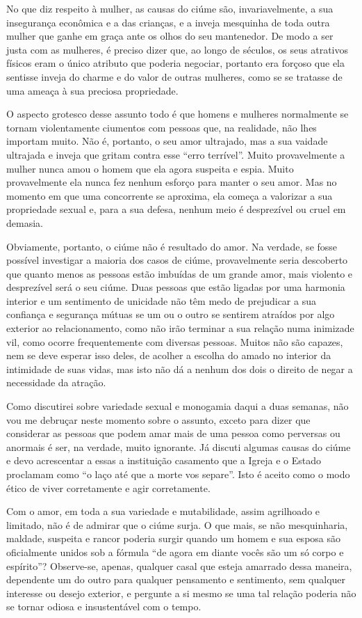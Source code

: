 No que diz respeito à mulher, as causas do ciúme são, invariavelmente, a
sua insegurança econômica e a das crianças, e a inveja mesquinha de toda
outra mulher que ganhe em graça ante os olhos do seu mantenedor. De modo a
ser justa com as mulheres, é preciso dizer que, ao longo de séculos, os seus
atrativos físicos eram o único atributo que poderia negociar, portanto era
forçoso que ela sentisse inveja do charme e do valor de outras mulheres,
como se se tratasse de uma ameaça à sua preciosa propriedade.

O aspecto grotesco desse assunto todo é que homens e mulheres
normalmente se tornam violentamente ciumentos com pessoas que, na
realidade, não lhes importam muito. Não é, portanto, o seu amor\label{ciume}
ultrajado, mas a sua vaidade ultrajada e inveja que gritam contra esse
``erro terrível''. Muito provavelmente a mulher nunca amou o homem que
ela agora suspeita e espia. Muito provavelmente ela nunca fez nenhum
esforço para manter o seu amor. Mas no momento em que uma concorrente se
aproxima, ela começa a valorizar a sua propriedade sexual e, para a sua
defesa, nenhum meio é desprezível ou cruel em demasia.

Obviamente, portanto, o ciúme não é resultado do amor. Na verdade, se
fosse possível investigar a maioria dos casos de ciúme, provavelmente
seria descoberto que quanto menos as pessoas estão imbuídas de um grande
amor, mais violento e desprezível será o seu ciúme. Duas pessoas que
estão ligadas por uma harmonia interior e um sentimento de unicidade não
têm medo de prejudicar a sua confiança e segurança mútuas se um ou o
outro se sentirem atraídos por algo exterior ao relacionamento, como não
irão terminar a sua relação numa inimizade vil, como ocorre
frequentemente com diversas pessoas. Muitos não são capazes, nem se deve
esperar isso deles, de acolher a escolha do amado no interior da
intimidade de suas vidas, mas isto não dá a nenhum dos dois o direito de
negar a necessidade da atração.

Como discutirei sobre variedade sexual e monogamia daqui a duas semanas,
não vou me debruçar neste momento sobre o assunto, exceto para dizer que
considerar as pessoas que podem amar mais de uma pessoa como perversas
ou anormais é ser, na verdade, muito ignorante. Já discuti algumas
causas do ciúme e devo acrescentar a essas a instituição casamento que a
Igreja e o Estado proclamam como ``o laço até que a morte vos separe''.
Isto é aceito como o modo ético de viver corretamente e agir
corretamente.

Com o amor, em toda a sua variedade e mutabilidade, assim agrilhoado e
limitado, não é de admirar que o ciúme surja. O que mais, se não
mesquinharia, maldade, suspeita e rancor poderia surgir quando um homem e
sua esposa são oficialmente unidos sob a fórmula ``de agora em diante
vocês são um só corpo e espírito''? Observe-se, apenas, qualquer casal que
esteja amarrado dessa maneira, dependente um do outro para qualquer
pensamento e sentimento, sem qualquer interesse ou desejo exterior, e
pergunte a si mesmo se uma tal relação poderia não se tornar odiosa e
insustentável com o tempo.


